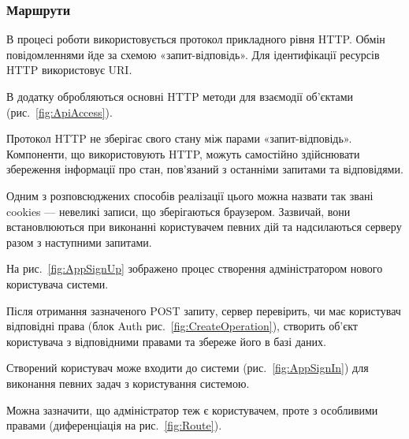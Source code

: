 \subsubsection{Маршрути}


В процесі роботи використовується протокол прикладного рівня HTTP. Обмін повідомленнями йде за схемою «запит-відповідь». Для ідентифікації ресурсів HTTP використовує URI. 

В додатку обробляються основні  HTTP методи для взаємодії об’єктами (рис.~\ref{fig:ApiAccess}). 

Протокол HTTP не зберігає свого стану між парами «запит-відповідь». Компоненти, що використовують HTTP, можуть самостійно здійснювати збереження інформації про стан, пов'язаний з останніми запитами та відповідями. 

Одним з розповсюджених способів реалізації цього можна назвати так звані cookies — невеликі записи, що зберігаються браузером. Зазвичай, вони встановлюються при виконанні користувачем певних дій та надсилаються серверу разом з наступними запитами. 

На рис.~\ref{fig:AppSignUp} зображено процес створення адміністратором нового користувача системи.


Після отримання зазначеного POST запиту, сервер перевірить, чи має користувач відповідні права (блок Auth рис.~\ref{fig:CreateOperation}), створить об’єкт користувача з відповідними правами та збереже його в базі даних.

Створений користувач може входити до системи (рис.~\ref{fig:AppSignIn}) для виконання певних задач з користування системою.


Можна зазначити, що адміністратор теж є користувачем, проте з особливими правами (диференціація на рис.~\ref{fig:Route}).
